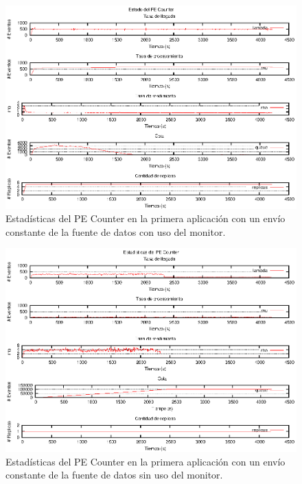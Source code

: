 \begin{figure}[p]
\centering
    \includegraphics[scale=1.1]{images/exp/app1/uniform/cm/statusCounterPE.eps}
    \caption{Estadísticas del PE Counter en la primera aplicación con un envío constante de la fuente de datos con uso del monitor.}
    \label{fig:app1-uniform-statusCounterPE-cm}
\end{figure}

\begin{figure}[p]
\centering
    \includegraphics[scale=1.1]{images/exp/app1/uniform/sm/statusCounterPE.eps}
    \caption{Estadísticas del PE Counter en la primera aplicación con un envío constante de la fuente de datos sin uso del monitor.}
    \label{fig:app1-uniform-statusCounterPE-sm}
\end{figure}

